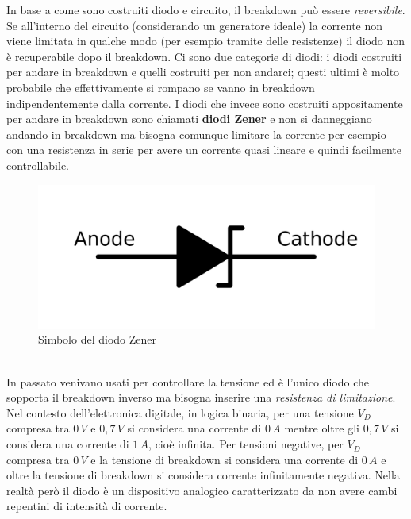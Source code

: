 \documentclass[12pt, a4paper]{report}
\begin{document}
In base a come sono costruiti diodo e circuito, il breakdown può essere \textit{reversibile}. Se all'interno del circuito (considerando un generatore ideale) la corrente non viene limitata in qualche modo (per esempio tramite delle resistenze) il diodo non è recuperabile dopo il breakdown. Ci sono due categorie di diodi: i diodi costruiti per andare in breakdown e quelli costruiti per non andarci; questi ultimi è molto probabile che effettivamente si rompano se vanno in breakdown indipendentemente dalla corrente. I diodi che invece sono costruiti appositamente per andare in breakdown sono chiamati \textbf{diodi Zener} e non si danneggiano andando in breakdown ma bisogna comunque limitare la corrente per esempio con una resistenza in serie per avere un corrente quasi lineare e quindi facilmente controllabile.
\begin{figure}[h]
\centering
\includegraphics[scale=0.15,angle=0]{diodo_zener.png}
\caption{Simbolo del diodo Zener}
\end{figure}
\\In passato venivano usati per controllare la tensione ed è l'unico diodo che sopporta il breakdown inverso ma bisogna inserire una \textit{resistenza di limitazione}.\\

Nel contesto dell'elettronica digitale, in logica binaria, per una tensione $V_{D}$ compresa tra $0\,V$ e $0,7\,V$ si considera una corrente di $0\,A$ mentre oltre gli $0,7\,V$ si considera una corrente di $1\,A$, cioè infinita. Per tensioni negative, per $V_{D}$ compresa tra $0\,V$ e la tensione di breakdown si considera una corrente di $0\,A$ e oltre la tensione di breakdown si considera corrente infinitamente negativa. Nella realtà però il diodo è un dispositivo analogico caratterizzato da non avere cambi repentini di intensità di corrente.
\end{document}
